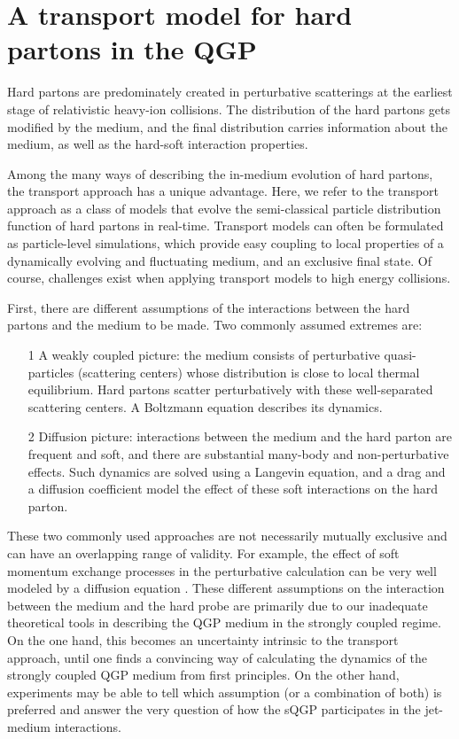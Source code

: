 \chapter{A transport model for hard partons in the QGP}
\label{chapter:transport}
Hard partons are predominately created in perturbative scatterings at the earliest stage of relativistic heavy-ion collisions.
The distribution of the hard partons gets modified by the medium, and the final distribution carries information about the medium, as well as the hard-soft interaction properties.

Among the many ways of describing the in-medium evolution of hard partons, 
the transport approach has a unique advantage. 
Here, we refer to the transport approach as a class of models that evolve the semi-classical particle distribution function of hard partons in real-time.
Transport models can often be formulated as particle-level simulations, which provide easy coupling to local properties of a dynamically evolving and fluctuating medium, and an exclusive final state.
Of course, challenges exist when applying transport models to high energy collisions.

First, there are different assumptions of the interactions between the hard partons and the medium to be made.
Two commonly assumed extremes are:
\begin{itemize}
\item[1] A weakly coupled picture: the medium consists of perturbative quasi-particles (scattering centers) whose distribution is close to local thermal equilibrium.
Hard partons scatter perturbatively with these well-separated scattering centers. A Boltzmann equation describes its dynamics.
\item[2] Diffusion picture: interactions between the medium and the hard parton are frequent and soft, and there are substantial many-body and non-perturbative effects. Such dynamics are solved using a Langevin equation, and a drag and a diffusion coefficient model the effect of these soft interactions on the hard parton. 
\end{itemize}
These two commonly used approaches are not necessarily mutually exclusive and can have an overlapping range of validity. 
For example, the effect of soft momentum exchange processes in the perturbative calculation can be very well modeled by a diffusion equation \cite{Ghiglieri:2015ala,Dai:2019hbi}.
These different assumptions on the interaction between the medium and the hard probe are primarily due to our inadequate theoretical tools in describing the QGP medium in the strongly coupled regime.
On the one hand, this becomes an uncertainty intrinsic to the transport approach, until one finds a convincing way of calculating the dynamics of the strongly coupled QGP medium from first principles.
On the other hand, experiments may be able to tell which assumption (or a combination of both) is preferred and answer the very question of how the sQGP participates in the jet-medium interactions.

